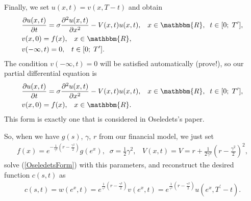 \documentclass[11pt,a4paper]{extarticle}
\begin{document}
Finally, we set $u(x,t) = v(x, T-t)$ and obtain
\begin{equation}
	\begin{aligned}
		&\frac{\partial u(x,t)}{\partial t} = \sigma \frac{\partial^2 u(x,t)}{\partial x^2} - V(x,t) u(x,t),
		\;\;\;x \in \mathbbm{R},\;\; t \in [0;\;T^{\prime}],\\
		&v(x,0) = f(x), \;\;\; x \in \mathbbm{R},\\
		&v(-\infty,t) = 0, \;\;\; t \in [0;\;T^{\prime}].
	\end{aligned}
\end{equation}
The condition $v(-\infty,t) = 0$ will be satisfied automatically (prove!), so our partial differential equation is
\begin{equation}
	\begin{aligned}
		&\frac{\partial u(x,t)}{\partial t} = \sigma \frac{\partial^2 u(x,t)}{\partial x^2} - V(x,t) u(x,t),
		\;\;\;x \in \mathbbm{R},\;\; t \in [0;\;T^{\prime}],\\
		&v(x,0) = f(x), \;\;\; x \in \mathbbm{R}.
	\label{OseledetsForm}
	\end{aligned}
\end{equation}
This form is exactly one that is considered in Oseledets's paper.

So, when we have $g(s)$, $\gamma$, $r$ from our financial model, we just set
\begin{equation}
	\begin{aligned}
		f(x) = e^{-\frac{1}{\gamma^2} (r-\frac{\gamma^2}{2})} g(e^x), \;\; \sigma = \frac12 \gamma^2, \;\;\; V(x,t) = V = r +  \frac{1}{2\gamma^2} \left( r-\frac{\gamma^2}{2}\right)^2,
	\end{aligned}
\end{equation}
solve (\ref{OseledetsForm}) with this parameters, and reconstruct the desired function $c(s,t)$ as
\begin{equation}
	\begin{aligned}
		c(s,t) = w(e^x, t) = e^{\frac{1}{\gamma^2} (r-\frac{\gamma^2}{2})} v(e^x, t) = e^{\frac{1}{\gamma^2} (r-\frac{\gamma^2}{2})} u(e^x, T^{\prime} - t).
	\end{aligned}
\end{equation}

		
\end{document}
